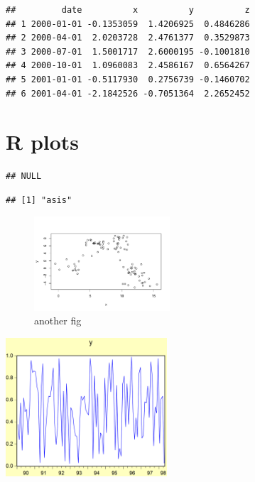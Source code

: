 \documentclass[
]{article}
\begin{document}
\begin{verbatim}
##         date          x          y          z
## 1 2000-01-01 -0.1353059  1.4206925  0.4846286
## 2 2000-04-01  2.0203728  2.4761377  0.3529873
## 3 2000-07-01  1.5001717  2.6000195 -0.1001810
## 4 2000-10-01  1.0960083  2.4586167  0.6564267
## 5 2001-01-01 -0.5117930  0.2756739 -0.1460702
## 6 2001-04-01 -2.1842526 -0.7051364  2.2652452
\end{verbatim}

\hypertarget{r-plots}{%
\section{R plots}\label{r-plots}}

\begin{verbatim}
## NULL
\end{verbatim}

\begin{verbatim}
## [1] "asis"
\end{verbatim}

\begin{figure}[h]

{\centering \includegraphics[width=0.45\textwidth]{test_engEviews_files/figure-latex/labe-1} 

}

\caption{another fig}\label{fig:labe}
\end{figure}

\begin{center}\includegraphics[width=0.45\textwidth]{test_engEviews_files/figure-latex//eview-graph-y} \end{center}
\end{document}

